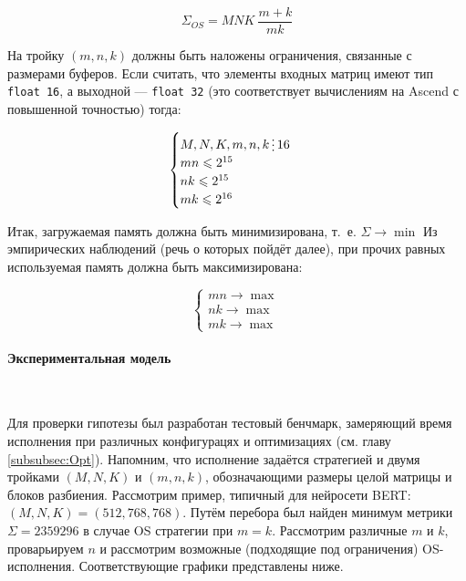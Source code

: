 \[
    \Sigma_{OS} = MNK ~ \frac{m + k}{mk}
\]

На тройку $(m, n, k)$ должны быть наложены ограничения, связанные с размерами буферов.
Если считать, что элементы входных матриц имеют тип \texttt{float 16}, а выходной ---
\texttt{float 32} (это соответствует вычислениям на Ascend с повышенной точностью) тогда:

\[
\begin{cases}
    M, N, K, m, n, k \divisible 16 \\
    mn \leqslant 2^{15} \\
    nk \leqslant 2^{15} \\
    mk \leqslant 2^{16}
\end{cases}
\]

Итак, загружаемая память должна быть минимизирована, т.~е. $\Sigma \rightarrow \min$
Из эмпирических наблюдений (речь о которых пойдёт далее), при прочих равных используемая
память должна быть максимизирована:

\[
\begin{cases}
    mn \rightarrow \max \\
    nk \rightarrow \max \\
    mk \rightarrow \max
\end{cases}
\]

\paragraph{Экспериментальная модель}~

Для проверки гипотезы был разработан тестовый бенчмарк, замеряющий время
исполнения при различных конфигурацях и оптимизациях (см. главу
\ref{subsubsec:Opt}). Напомним, что исполнение задаётся стратегией и двумя
тройками $(M, N, K)$ и $(m, n, k)$, обозначающими размеры целой матрицы и блоков
разбиения. Рассмотрим пример, типичный для нейросети BERT:
$(M, N, K) = (512, 768, 768)$. Путём перебора был найден минимум метрики
$\Sigma = 2359296$ в случае OS стратегии при $m = k$.  Рассмотрим различные
$m$ и $k$, проварьируем $n$ и рассмотрим возможные (подходящие под ограничения)
OS-исполнения. Соответствующие графики представлены ниже.

